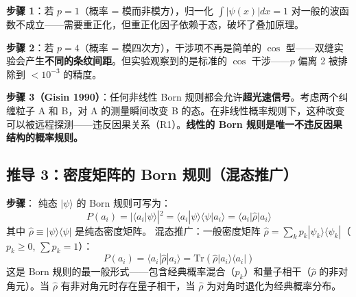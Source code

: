 \textbf{步骤 1}：若 $p=1$（概率 = 模而非模方），归一化 $\int |\psi(x)| dx = 1$ 对一般的波函数不成立——需要重正化，但重正化因子依赖于态，破坏了叠加原理。

\textbf{步骤 2}：若 $p=4$（概率 = 模四次方），干涉项不再是简单的 $\cos$ 型——双缝实验会产生\textbf{不同的条纹间距}。但实验观察到的是标准的 $\cos$ 干涉——$p$ 偏离 2 被排除到 $<10^{-3}$ 的精度。

\textbf{步骤 3（Gisin 1990）}：任何非线性 Born 规则都会允许\textbf{超光速信号}。考虑两个纠缠粒子 A 和 B，对 A 的测量瞬间改变 B 的态。在非线性概率规则下，这种改变可以被远程探测——违反因果关系（R1）。\textbf{线性的 Born 规则是唯一不违反因果结构的概率规则。}

\subsection{推导 3：密度矩阵的 Born 规则（混态推广）}

\textbf{步骤}：\fbox{[S]} 纯态 $|\psi\rangle$ 的 Born 规则可写为：
\begin{equation}
P(a_i) = |\langle a_i|\psi\rangle|^2 = \langle a_i|\psi\rangle\langle\psi|a_i\rangle = \langle a_i|\hat{\rho}|a_i\rangle
\end{equation}
其中 $\hat{\rho} \equiv |\psi\rangle\langle\psi|$ 是纯态密度矩阵。\fbox{[S]} 混态推广：一般密度矩阵 $\hat{\rho} = \sum_k p_k|\psi_k\rangle\langle\psi_k|$（$p_k \ge 0$, $\sum p_k = 1$）：
\begin{equation}
\boxed{P(a_i) = \langle a_i|\hat{\rho}|a_i\rangle = \text{Tr}(\hat{\rho}|a_i\rangle\langle a_i|)}
\end{equation}
\fbox{[S]} 这是 Born 规则的最一般形式——包含经典概率混合（$p_k$）和量子相干（$\hat{\rho}$ 的非对角元）。当 $\hat{\rho}$ 有非对角元时存在量子相干，当 $\hat{\rho}$ 为对角时退化为经典概率分布。


